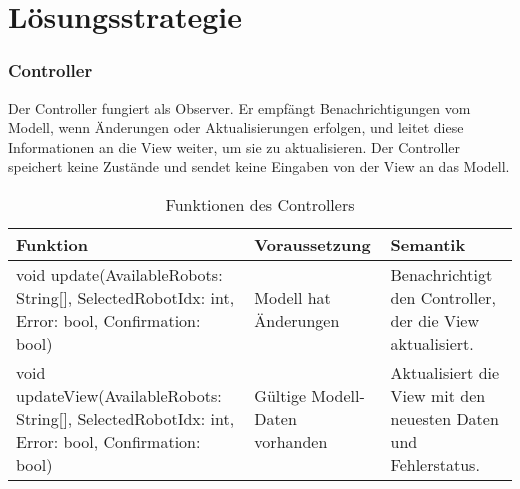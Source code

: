 \chapter{Lösungsstrategie}

\subsection{Controller}
Der Controller fungiert als Observer. 
Er empfängt Benachrichtigungen vom Modell, wenn Änderungen oder Aktualisierungen erfolgen, und leitet diese Informationen an die View weiter, um sie zu aktualisieren. 
Der Controller speichert keine Zustände und sendet keine Eingaben von der View an das Modell.

\begin{table}[h!]
    \centering
    \begin{tabular}{|p{5cm}|p{5cm}|p{5cm}|}
        \hline
        \textbf{Funktion} & \textbf{Voraussetzung} & \textbf{Semantik} \\
        \hline
        void update(AvailableRobots: String[], SelectedRobotIdx: int, Error: bool, Confirmation: bool) & Modell hat Änderungen & Benachrichtigt den Controller, der die View aktualisiert. \\
        \hline
        void updateView(AvailableRobots: String[], SelectedRobotIdx: int, Error: bool, Confirmation: bool) & Gültige Modell-Daten vorhanden & Aktualisiert die View mit den neuesten Daten und Fehlerstatus. \\
        \hline
    \end{tabular}
    \caption{Funktionen des Controllers}
    \label{tab:Controller}
\end{table}

\clearpage
